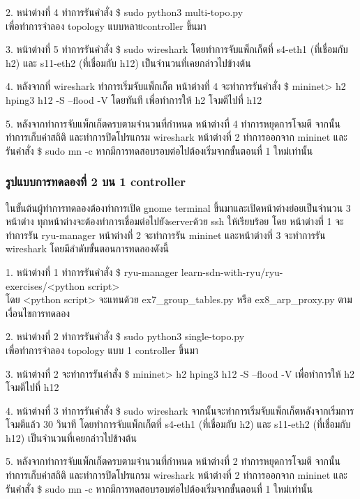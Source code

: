 2. หน่าต่างที่ 4 ทำการรันคำสั่ง    
\$ sudo python3 multi-topo.py \\
เพื่อทำการจำลอง topology แบบหลาย\gls{controller} ขึ้นมา

3. หน้าต่างที่ 5 ทำการรันคำสั่ง 
\$ sudo wireshark 
โดยทำการจับแพ็กเก็ตที่ s4-eth1 (ที่เชื่อมกับ h2) และ s11-eth2 (ที่เชื่อมกับ h12) เป็นจำนวนที่เคยกล่าวไปข้างต้น

4. หลังจากที่ wireshark ทำการเริ่มจับแพ็กเก็ต หน้าต่างที่ 4 จะทำการรันคำสั่ง \$ mininet> h2 hping3 h12 -S --flood -V
โดยทันที เพื่อทำการให้ h2 โจมตีไปที่ h12

5. หลังจากทำการจับแพ็กเก็ตครบตามจำนวนที่กำหนด หน้าต่างที่ 4 ทำการหยุดการโจมตี จากนั้นทำการเก็บค่าสถิติ และทำการปิดโปรแกรม wireshark
หน้าต่างที่ 2 ทำการออกจาก mininet และรันคำสั่ง \$ sudo mn -c หากมีการทดสอบรอบต่อไปต้องเริ่มจากขั้นตอนที่ 1 ใหม่เท่านั้น

\subsubsection*{รูปแบบการทดลองที่ 2 บน 1 \gls{controller}}

ในขั้นต้นผู้ทำการทดลองต้องทำการเปิด gnome terminal ขึ้นมาและเปิดหน้าต่างย่อยเป็นจำนวน 3 หน้าต่าง
ทุกหน้าต่างจะต้องทำการเชื่อมต่อไปยัง\gls{server}ด้วย ssh ให้เรียบร้อย
โดย หน้าต่างที่ 1 จะทำการรัน ryu-manager หน้าต่างที่ 2 จะทำการรัน mininet และหน้าต่างที่ 3 จะทำการรัน wireshark
โดยมีลำดับขั้นตอนการทดลองดังนี้


1. หน้าต่างที่ 1 ทำการรันคำสั่ง    
\$ ryu-manager learn-sdn-with-ryu/ryu-exercises/<python script> \\
โดย <python script> จะแทนด้วย ex7\_group\_tables.py หรือ ex8\_arp\_proxy.py ตามเงื่อนไขการทดลอง

2. หน่าต่างที่ 2 ทำการรันคำสั่ง    
\$ sudo python3 single-topo.py \\
เพื่อทำการจำลอง topology แบบ 1 \gls{controller} ขึ้นมา

3. หน้าต่างที่ 2 จะทำการรันคำสั่ง \$ mininet> h2 hping3 h12 -S --flood -V
เพื่อทำการให้ h2 โจมตีไปที่ h12

4. หน้าต่างที่ 3 ทำการรันคำสั่ง 
\$ sudo wireshark 
จากนั้นจะทำการเริ่มจับแพ็กเก็ตหลังจากเริ่มการโจมตีแล้ว 30 วินาที
โดยทำการจับแพ็กเก็ตที่ s4-eth1 (ที่เชื่อมกับ h2) และ s11-eth2 (ที่เชื่อมกับ h12) เป็นจำนวนที่เคยกล่าวไปข้างต้น


5. หลังจากทำการจับแพ็กเก็ตครบตามจำนวนที่กำหนด หน้าต่างที่ 2 ทำการหยุดการโจมตี จากนั้นทำการเก็บค่าสถิติ และทำการปิดโปรแกรม wireshark
หน้าต่างที่ 2 ทำการออกจาก mininet และรันคำสั่ง \$ sudo mn -c หากมีการทดสอบรอบต่อไปต้องเริ่มจากขั้นตอนที่ 1 ใหม่เท่านั้น

